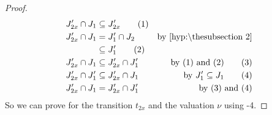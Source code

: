 \documentclass{article}
\begin{document}
\begin{proof}
\begin{align*}
	J'_{2x} \cap J_1 & \subseteq J'_{2x} \tag{1} \\
	J'_{2x} \cap J_1 & = J'_1 \cap J_2 & \text{by \hyp{2}} \\
	& \subseteq J'_1 \tag{2} \\
	J'_{2x} \cap J_1 & \subseteq J'_{2x} \cap J'_1 & \text{by (1) and (2)} \tag{3} \\
	J'_{2x} \cap J'_1 & \subseteq J'_{2x} \cap J_1 & \text{by } J'_1 \subseteq J_1 \tag{4} \\
	J'_{2x} \cap J_1 & = J'_{2x} \cap J'_1 & \text{by (3) and (4)}
\end{align*}
So we can prove  for the transition \(t_{2x}\) and the valuation \(\nu\) using \hyp{4}.
\end{proof}
\end{document}
